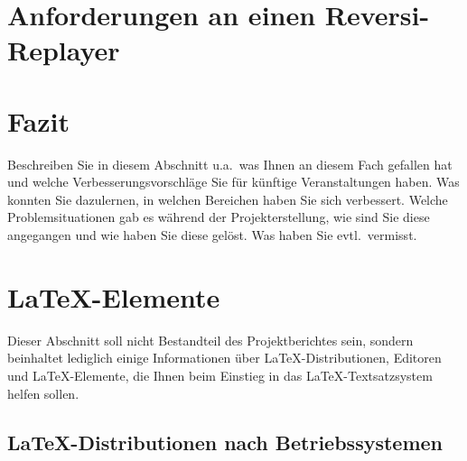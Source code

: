 \documentclass[12pt,a4paper,bibliography=totocnumbered,listof=totocnumbered]{scrartcl}
\begin{document}
	\section{Anforderungen an einen Reversi-Replayer}
	
	


    \newpage
    \section{Fazit}
    Beschreiben Sie in diesem Abschnitt u.a.\ was Ihnen an diesem Fach gefallen hat und welche Verbesserungsvorschläge Sie für künftige Veranstaltungen haben. Was konnten Sie dazulernen, in welchen Bereichen haben Sie sich verbessert. Welche Problemsituationen gab es während der Projekterstellung, wie sind Sie diese angegangen und wie haben Sie diese gelöst. Was haben Sie evtl.\ vermisst.

    \newpage
    
    
    \section{\LaTeX-Elemente}
    Dieser Abschnitt soll nicht Bestandteil des Projektberichtes sein, sondern beinhaltet lediglich einige Informationen über \LaTeX-Distributionen, Editoren und \LaTeX-Elemente, die Ihnen beim Einstieg in das \LaTeX-Textsatzsystem helfen sollen.

    \subsection{\LaTeX-Distributionen nach Betriebssystemen}
\end{document}
